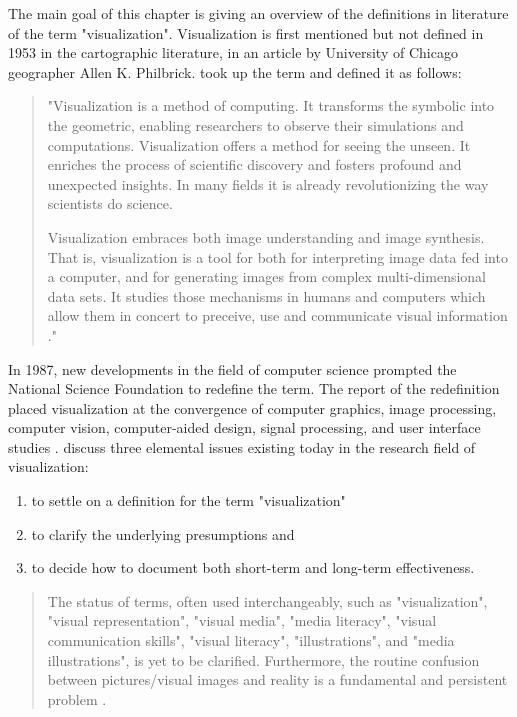 The main goal of this chapter is giving an overview of the definitions in literature of the term "visualization". Visualization is first mentioned but not defined in 1953 in the cartographic literature, in an article by University of Chicago geographer Allen K. Philbrick. \citeauthor{mccormick:1987} took up the term and defined it as follows:
\begin{quote}
 "Visualization is a method of computing. It transforms the symbolic into the geometric, enabling researchers to observe their simulations and computations. Visualization offers a method for seeing the unseen. It enriches the process of scientific discovery and fosters profound and unexpected insights. In many fields it is already revolutionizing the way scientists do science.

 Visualization embraces both image understanding and image synthesis. That is, visualization is a tool for both for interpreting image data fed into a computer, and for generating images from complex multi-dimensional data sets. It studies those mechanisms in humans and computers which allow them in concert to preceive, use and communicate visual information ."
\end{quote}

In 1987, new developments in the field of computer science prompted the National Science Foundation to redefine the term. The report of the redefinition placed visualization at the convergence of computer graphics, image processing, computer vision, computer-aided design, signal processing, and user interface studies . \citeauthor{Phillips2010} discuss three elemental issues existing today in the research field of visualization:

\begin{enumerate}
\item to settle on a definition for the term "visualization"
\item to clarify the underlying presumptions and
\item to decide how to document both short-term and long-term effectiveness.
\end{enumerate}

\begin{quote}
The status of terms, often used interchangeably, such as "visualization", "visual representation", "visual media", "media literacy", "visual communication skills", "visual literacy", "illustrations", and "media illustrations", is yet to be clarified. Furthermore, the routine confusion between pictures/visual images and reality is a fundamental and persistent problem .
\end{quote}

